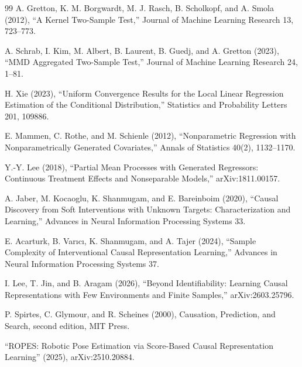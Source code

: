 \documentclass{article}
\begin{document}
\begin{thebibliography}{99}
   A. Gretton, K. M. Borgwardt, M. J. Rasch, B. Scholkopf, and A. Smola (2012), ``A Kernel Two-Sample Test,'' Journal of Machine Learning Research 13, 723--773.

   A. Schrab, I. Kim, M. Albert, B. Laurent, B. Guedj, and A. Gretton (2023), ``MMD Aggregated Two-Sample Test,'' Journal of Machine Learning Research 24, 1--81.

   H. Xie (2023), ``Uniform Convergence Results for the Local Linear Regression Estimation of the Conditional Distribution,'' Statistics and Probability Letters 201, 109886.

   E. Mammen, C. Rothe, and M. Schienle (2012), ``Nonparametric Regression with Nonparametrically Generated Covariates,'' Annals of Statistics 40(2), 1132--1170.

   Y.-Y. Lee (2018), ``Partial Mean Processes with Generated Regressors: Continuous Treatment Effects and Nonseparable Models,'' arXiv:1811.00157.

   A. Jaber, M. Kocaoglu, K. Shanmugam, and E. Bareinboim (2020), ``Causal Discovery from Soft Interventions with Unknown Targets: Characterization and Learning,'' Advances in Neural Information Processing Systems 33.

   E. Acarturk, B. Var\i{}c\i{}, K. Shanmugam, and A. Tajer (2024), ``Sample Complexity of Interventional Causal Representation Learning,'' Advances in Neural Information Processing Systems 37.

   I. Lee, T. Jin, and B. Aragam (2026), ``Beyond Identifiability: Learning Causal Representations with Few Environments and Finite Samples,'' arXiv:2603.25796.

   P. Spirtes, C. Glymour, and R. Scheines (2000), Causation, Prediction, and Search, second edition, MIT Press.

   ``ROPES: Robotic Pose Estimation via Score-Based Causal Representation Learning'' (2025), arXiv:2510.20884.

\end{thebibliography}
\end{document}
